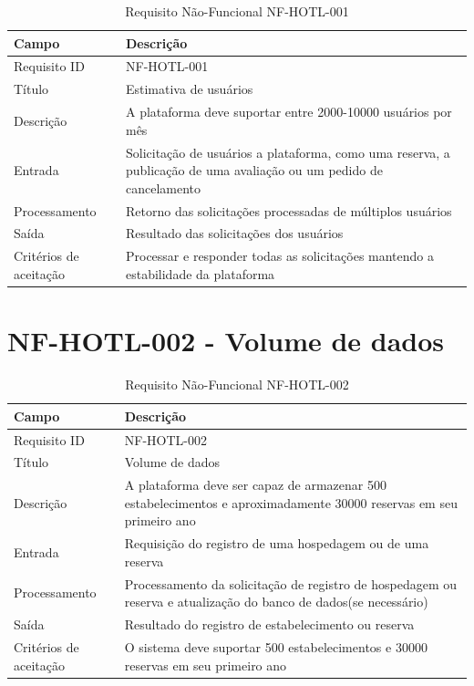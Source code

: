 \documentclass[
    12pt,
    oneside,
    a4paper,
    brazil
]{abntex2}
\begin{document}
\begin{table}[h]
	\begin{tabular}{|l|p{10cm}|}
		\hline
		\textbf{Campo} & \textbf{Descrição} \\
		\hline
		Requisito ID & NF-HOTL-001 \\
		\hline
		Título & Estimativa de usuários\\
		\hline
		Descrição &  A plataforma deve suportar entre 2000-10000 usuários por mês\\
		\hline
		Entrada & Solicitação de usuários a plataforma, como uma reserva, a publicação de uma avaliação ou um pedido de cancelamento \\
		\hline
		Processamento & Retorno das solicitações processadas de múltiplos usuários \\
		\hline
		Saída & Resultado das solicitações dos usuários\\
		\hline
		Critérios de aceitação &  Processar e responder todas as solicitações mantendo a estabilidade da plataforma\\
		\hline
	\end{tabular}
	\caption{Requisito Não-Funcional NF-HOTL-001}
\end{table}

\section{NF-HOTL-002 - Volume de dados}

\begin{table}[h]
	\begin{tabular}{|l|p{10cm}|}
		\hline
		\textbf{Campo} & \textbf{Descrição} \\
		\hline
		Requisito ID & NF-HOTL-002 \\
		\hline
		Título & Volume de dados\\
		\hline
		Descrição &  A plataforma deve ser capaz de armazenar 500 estabelecimentos e aproximadamente 30000 reservas em seu primeiro ano\\
		\hline
		Entrada & Requisição do registro de uma hospedagem ou de uma reserva \\
		\hline
		Processamento & Processamento da solicitação de registro de hospedagem ou reserva e atualização do banco de dados(se necessário) \\
		\hline
		Saída & Resultado do registro de estabelecimento ou reserva\\
		\hline
		Critérios de aceitação & O sistema deve suportar 500 estabelecimentos e 30000 reservas em seu primeiro ano\\
		\hline
	\end{tabular}
	\caption{Requisito Não-Funcional NF-HOTL-002}
\end{table}
\end{document}
